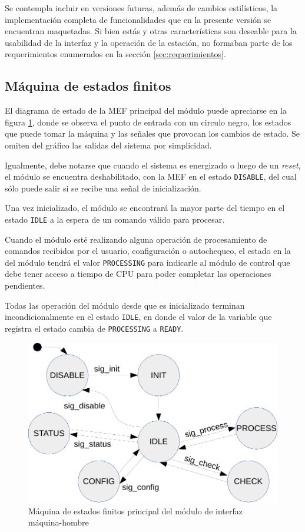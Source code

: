 Se contempla incluir en versiones futuras, además de cambios estilísticos, la implementación completa de funcionalidades que en la presente versión se encuentran maquetadas.  Si bien estás y otras características son deseable para la usabilidad de la interfaz y la operación de la estación, no formaban parte de los requerimientos enumerados en la sección \ref{sec:requerimientos}. 



\subsection{Máquina de estados finitos}

El diagrama de estado de la MEF principal del módulo puede apreciarse en la figura \ref{fig:mef_HMI}, donde se observa el punto de entrada con un circulo negro, los estados que puede tomar la máquina y las señales que provocan los cambios de estado. Se omiten del gráfico las salidas del sistema por simplicidad. 

Igualmente, debe notarse que cuando el sistema es energizado o luego de un \textit{reset}, el módulo se encuentra deshabilitado, con la MEF en el estado \texttt{DISABLE}, del cual sólo puede salir si se recibe una señal de inicialización.  

Una vez inicializado, el módulo se encontrará la mayor parte del tiempo en el estado \texttt{IDLE} a la espera de un comando válido para procesar.  

Cuando el módulo esté realizando alguna operación de procesamiento de comandos recibidos por el usuario, configuración o autochequeo, el estado en la del módulo tendrá el valor \texttt{PROCESSING} para indicarle al módulo de control que debe tener acceso a tiempo de CPU para poder completar las operaciones pendientes.  

Todas las operación del módulo desde que es inicializado terminan incondicionalmente en el estado \texttt{IDLE}, en donde el valor de la variable que registra el estado cambia de \texttt{PROCESSING} a \texttt{READY}.

\begin{figure}[htpb]
	\centering
	\includegraphics[width=\textwidth]{./Figures/MEF_HMI_2.pdf}
	\caption[MEF principal del módulo de HMI]{Máquina de estados finitos principal del módulo de interfaz máquina-hombre}
	\label{fig:mef_HMI}
\end{figure}

